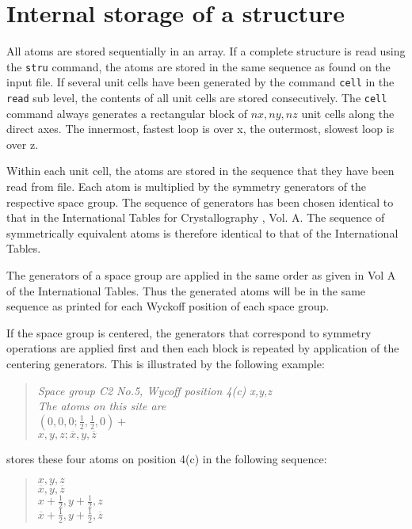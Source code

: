 
\section{Internal storage of a structure \label{struc-int}}

All atoms are stored sequentially in an array.  If a complete
structure is read using the {\tt stru} command, the atoms are stored
in the same sequence as found on the input file. If several unit
cells have been generated by the command {\tt cell} in the {\tt
read} sub level, the contents of all unit cells are stored
consecutively. The {\tt cell} command always generates a rectangular
block of $nx, ny, nz$ unit cells along the direct axes.  The
innermost, fastest loop is over x, the outermost, slowest loop is
over z.  

Within each unit cell, the atoms are stored in the sequence
that they have been read from file. Each atom is multiplied by the
symmetry generators of the respective space group.  The sequence of
generators has been chosen identical to that in the International
Tables for Crystallography \cite{tables}, Vol.  A.  The sequence of
symmetrically equivalent atoms is therefore identical to that of the
International Tables. 

The generators of a space group are applied in the same order as
given in Vol A of the International Tables. Thus the generated atoms
will be in the same sequence as printed for each Wyckoff position of 
each space group. 

If the space group is centered, the generators
that correspond to symmetry operations are applied first and then
each block is repeated by application of the centering generators.
This is illustrated by the following example:
 
\begin{quote}
  {\it Space group C2 No.5, Wycoff position 4(c) x,y,z \\
       The atoms on this site are } \\
       $(0,0,0; \frac{1}{2},\frac{1}{2},0)+$ \\
       $x,y,z; \overline{x},y,\overline{z}$
\end{quote}

\Discus stores these four atoms on position 4(c) in the
following sequence:

\begin{quote}
       $x,y,z$\\
       $\overline{x},y,\overline{z}$\\
       $x+\frac{1}{2},y+\frac{1}{2},z$\\
       $\overline{x}+\frac{1}{2},y+\frac{1}{2},\overline{z}$
\end{quote}

